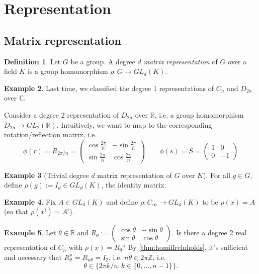 \documentclass[a4paper]{article}
\newcommand{\Z}{\mathbb{Z}}
\newcommand{\R}{\mathbb{R}}
\newcommand{\C}{\mathbb{C}}
\theoremstyle{definition}
\newtheorem{defn}{Definition}[subsection]
\newtheorem{example}[defn]{Example}
\begin{document}
\section{Representation}
\subsection{Matrix representation}
\begin{defn}
Let $G$ be a group. A degree $d$ \textit{matrix representation} of $G$ over a field $K$ is a group homomorphism $\rho:G\rightarrow GL_d(K)$.
\end{defn}
\begin{example}
\label{example:D2n->GL2R}
Last time, we classified the degree 1 representations of $C_n$ and $D_{2n}$ over $\C$.

Consider a degree 2 representation of $D_{2n}$ over $\R$, i.e. a group homomorphism $D_{2n}\rightarrow GL_2(\R)$. Intuitively, we want to map to the corresponding rotation/reflection matrix, i.e.
\[
\phi(r) =R_{2\pi/n}=\begin{pmatrix}
\cos \frac{2\pi}{n} & -\sin \frac{2\pi}{n}\\
\sin \frac{2\pi}{n} & \cos \frac{2\pi}{n}
\end{pmatrix} \qquad \phi(s) =S=\begin{pmatrix}
1 & 0 \\ 0 & -1
\end{pmatrix}
\]
\end{example}

\begin{example}[Trivial degree $d$ matrix representation of $G$ over $K$] For all $g\in G$, define $\rho(g):=I_d\in GL_d(K)$, the identity matrix.
\end{example}

\begin{example}
Fix $A\in GL_d(K)$ and define $\rho:C_\infty\rightarrow GL_d(K)$ to be $\rho(x)=A$ (so that $\rho(x^i)=A^i$).
\end{example}

\begin{example}
Let $\theta\in\R$ and $R_\theta:=\begin{pmatrix}
\cos \theta & -\sin \theta\\
\sin \theta & \cos \theta
\end{pmatrix}$. Is there a degree 2 real representation of $C_n$ with $\rho(x)=R_\theta$? By \ref{thm:homiffrelnholds}, it's sufficient and necessary that $R_\theta^n=R_{n\theta}=I_2$, i.e. $n\theta\in 2\pi \Z$, i.e.
\[
\theta\in\{2\pi k/n : k\in\{0,\ldots,n-1\}\}.
\]
\end{example}
\end{document}
